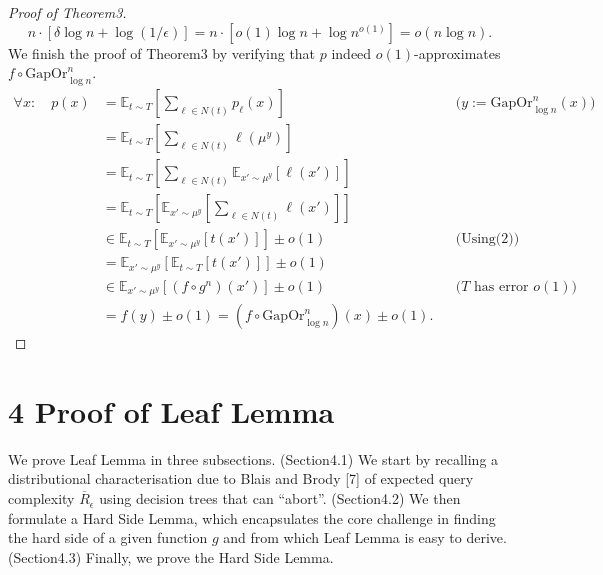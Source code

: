 \documentclass[10pt,a4paper]{article}
\begin{document}
\begin{proof}[Proof of Theorem3]
\[n\cdot[\delta\log n+\log(1/\epsilon)]=n\cdot[o(1)\log n+\log n^{o(1)}]=o(n\log n).\]
We finish the proof of Theorem3 by verifying that $p$ indeed $o(1)$-approximates $f\circ\mathrm{GapOr}_{\log n}^n$.
\begin{align*}
\forall x:\quad p(x)&=\mathbb E_{t\sim T}\left[\sum_{\ell\in N(t)}p_\ell(x)\right]&&\bigl(y:=\mathrm{GapOr}_{\log n}^n(x)\bigr)\\
&=\mathbb E_{t\sim T}\left[\sum_{\ell\in N(t)}\ell(\mu^y)\right]\\
&=\mathbb E_{t\sim T}\left[\sum_{\ell\in N(t)}\mathbb E_{x'\sim\mu^y}[\ell(x')]\right]\\
&=\mathbb E_{t\sim T}\left[\mathbb E_{x'\sim\mu^y}\left[\sum_{\ell\in N(t)}\ell(x')\right]\right]\\
&\in\mathbb E_{t\sim T}\left[\mathbb E_{x'\sim\mu^y}[t(x')]\right]\pm o(1)&&\text{(Using(2))}\\
&=\mathbb E_{x'\sim\mu^y}\left[\mathbb E_{t\sim T}[t(x')]\right]\pm o(1)\\
&\in\mathbb E_{x'\sim\mu^y}[(f\circ g^n)(x')]\pm o(1)&&\text{($T$ has error $o(1)$)}\\
&=f(y)\pm o(1)=(f\circ\mathrm{GapOr}_{\log n}^n)(x)\pm o(1).
\end{align*}
\end{proof}

\section*{4 Proof of Leaf Lemma}
We prove Leaf Lemma in three subsections.
(Section4.1) We start by recalling a distributional characterisation due to Blais and Brody [7] of expected query complexity $\overline R_\epsilon$ using decision trees that can ``abort''.
(Section4.2) We then formulate a Hard Side Lemma, which encapsulates the core challenge in finding the hard side of a given function $g$ and from which Leaf Lemma is easy to derive.
(Section4.3) Finally, we prove the Hard Side Lemma.
\end{document}
